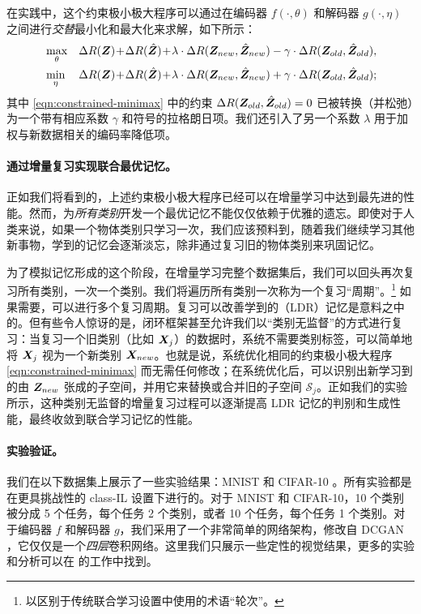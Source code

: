 \documentclass[../../book-main_zh.tex]{subfiles}
\begin{document}
在实践中，这个约束极小极大程序可以通过在编码器 $f(\cdot, \theta)$ 和解码器 $g(\cdot, \eta)$ 之间进行{\em 交替}最小化和最大化来求解，如下所示：
\begin{eqnarray}
&\max_\theta  &\Delta{R(\Z)}\!+\!\Delta{R(\hat{\Z})}\!+\!\lambda\cdot  \Delta{R(\Z_{new},\hat{\Z}_{new})} - \gamma\cdot \Delta{R(\Z_{old},\hat{\Z}_{old})}, \label{eqn:relaxed-max}\\ 
&\min_\eta &\Delta{R(\Z)}\!+\!\Delta{R(\hat{\Z})}\!+\!\lambda\cdot \Delta{R(\Z_{new},\hat{\Z}_{new})} + \gamma\cdot \Delta{R(\Z_{old},\hat{\Z}_{old})}; \label{eqn:relaxed-min}
\end{eqnarray}
其中 \eqref{eqn:constrained-minimax} 中的约束 $\Delta R(\bm{Z}_{old},\hat{\bm{Z}}_{old}) = 0$ 已被转换（并松弛）为一个带有相应系数 $\gamma$ 和符号的拉格朗日项。我们还引入了另一个系数 $\lambda$ 用于加权与新数据相关的编码率降低项。%



\paragraph{通过增量复习实现联合最优记忆。} 
正如我们将看到的，上述约束极小极大程序已经可以在增量学习中达到最先进的性能。然而，为{\em 所有类别}开发一个最优记忆不能仅仅依赖于优雅的遗忘。即使对于人类来说，如果一个物体类别只学习一次，我们应该预料到，随着我们继续学习其他新事物，学到的记忆会逐渐淡忘，除非通过复习旧的物体类别来巩固记忆。

为了模拟记忆形成的这个阶段，在增量学习完整个数据集后，我们可以回头再次复习所有类别，一次一个类别。我们将遍历所有类别一次称为一个复习“周期”。\footnote{以区别于传统联合学习设置中使用的术语“轮次”。} 如果需要，可以进行多个复习周期。复习可以改善学到的（LDR）记忆是意料之中的。但有些令人惊讶的是，闭环框架甚至允许我们以“{类别无监督}”的方式进行复习：当复习一个旧类别（比如 $\bm{X}_j$）的数据时，系统不需要类别标签，可以简单地将 $\bm{X}_j$ 视为一个新类别 $\bm{X}_{new}$。也就是说，系统优化相同的约束极小极大程序 \eqref{eqn:constrained-minimax} 而无需任何修改；在系统优化后，可以识别出新学习到的由 $\bm{Z}_{new}$ 张成的子空间，并用它来替换或合并旧的子空间 $\mathcal{S}_j$。正如我们的实验所示，这种类别无监督的增量复习过程可以逐渐提高 LDR 记忆的判别和生成性能，最终收敛到联合学习记忆的性能。

\paragraph{实验验证。}
我们在以下数据集上展示了一些实验结果：MNIST \cite{lecun1998gradient} 和 CIFAR-10 \cite{krizhevsky2014cifar}。所有实验都是在更具挑战性的 class-IL 设置下进行的。对于 MNIST 和 CIFAR-10，10 个类别被分成 5 个任务，每个任务 2 个类别，或者 10 个任务，每个任务 1 个类别。对于编码器 $f$ 和解码器 $g$，我们采用了一个非常简单的网络架构，修改自 DCGAN \cite{radford2016unsupervised}，它仅仅是一个{\em 四层}卷积网络。这里我们只展示一些定性的视觉结果，更多的实验和分析可以在 \cite{tong2023incremental} 的工作中找到。
\end{document}
